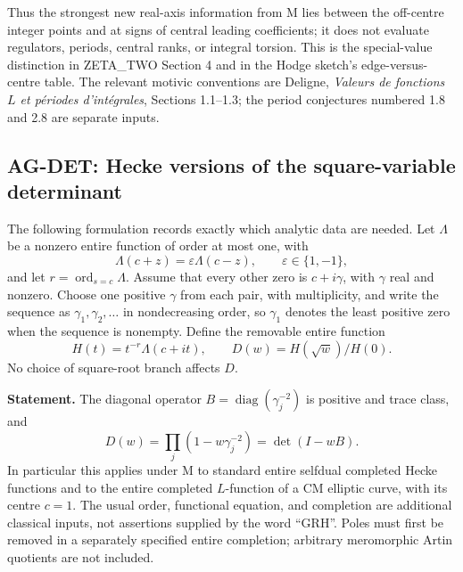 Thus the strongest new real-axis information from M lies between the
off-centre integer points and at signs of central leading coefficients;
it does not evaluate regulators, periods, central ranks, or integral
torsion. This is the special-value distinction in ZETA\_TWO Section 4
and in the Hodge sketch's edge-versus-centre table. The relevant motivic
conventions are Deligne, \emph{Valeurs de fonctions $L$ et p\'eriodes
d'int\'egrales}, Sections 1.1--1.3; the period conjectures numbered 1.8
and 2.8 are separate inputs.

\subsection{AG-DET: Hecke versions of the square-variable determinant}
\label{ag:det}

The following formulation records exactly which analytic data are needed.
Let $\Lambda$ be a nonzero entire function of order at most one, with
\[
 \Lambda(c+z)=\varepsilon\Lambda(c-z),\qquad
 \varepsilon\in\{1,-1\},
\]
and let $r=\operatorname{ord}_{s=c}\Lambda$. Assume that every other zero
is $c+i\gamma$, with $\gamma$ real and nonzero. Choose one positive
$\gamma$ from each pair, with multiplicity, and write the sequence as
$\gamma_1,\gamma_2,\ldots$ in nondecreasing order, so $\gamma_1$
denotes the least positive zero when the sequence is nonempty.
Define the removable entire function
\[
 H(t)=t^{-r}\Lambda(c+it),\qquad
 D(w)=H(\sqrt w)/H(0).
\]
No choice of square-root branch affects $D$.

\textbf{Statement.} The diagonal operator
$B=\operatorname{diag}(\gamma_j^{-2})$ is positive and trace class, and
\[
 D(w)=\prod_j(1-w\gamma_j^{-2})=\det(I-wB).
\]
In particular this applies under M to standard entire selfdual completed
Hecke functions and to the entire completed $L$-function of a CM elliptic
curve, with its centre $c=1$. The usual order, functional equation,
and completion are additional classical inputs, not assertions supplied
by the word ``GRH''. Poles must first be removed in a separately specified
entire completion; arbitrary meromorphic Artin quotients are not included.

